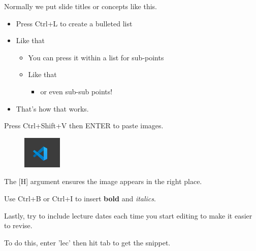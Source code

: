 \documentclass[12pt]{article}
\begin{document}
Normally we put slide titles or concepts like this.
\begin{itemize}[noitemsep]
    \item Press Ctrl+L to create a bulleted list
    \item Like that
    \begin{itemize}[noitemsep]
        \item You can press it within a list for sub-points
        \item Like that
        \begin{itemize}[noitemsep]
            \item or even sub-sub points!
        \end{itemize}
    \end{itemize}
    \item That's how that works.
\end{itemize}

Press Ctrl+Shift+V then ENTER to paste images.
\begin{figure}[H]
    \centering
    \includegraphics[width=0.5\linewidth]{images/image3.png}
\end{figure}

The [H] argument ensures the image appears in the right place.

Use Ctrl+B or Ctrl+I to insert \textbf{bold} and \textit{italics}.

\begin{flushright}[Lecture on 3.4]\end{flushright}
Lastly, try to include lecture dates each time you start editing to make it easier to revise.

To do this, enter 'lec' then hit tab to get the snippet.
\end{document}
